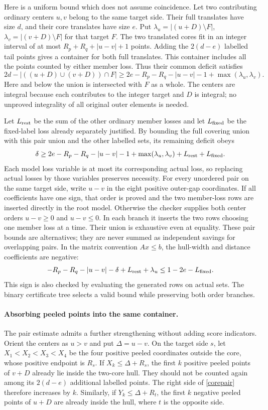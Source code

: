 \documentclass[11pt,a4paper]{article}
\begin{document}
Here is a uniform bound which does not assume coincidence. Let two contributing
ordinary centers $u,v$ belong to the same target side. Their full translates
have size $d$, and their core translates have size $e$. Put
$\lambda_u=|(u+D)\setminus F|$, $\lambda_v=|(v+D)\setminus F|$ for that
target $F$. The two translated cores fit in an integer interval of at most
$R_p+R_q+|u-v|+1$ points. Adding the $2(d-e)$ labelled tail points gives a
container for both full translates. This container includes all the points
counted by either member loss. Thus their common deficit satisfies
\begin{equation}\label{corepair}
 2d-|((u+D)\cup(v+D))\cap F|
 \ge 2e-R_p-R_q-|u-v|-1+\max(\lambda_u,\lambda_v).
\end{equation}
Here and below the union is intersected with $F$ as a whole.
The centers are integral because each contributes to the integer target and
$D$ is integral; no unproved integrality of all original outer elements is needed.

Let $L_{\rm rest}$ be the sum of the other ordinary member losses and let
$L_{\rm fixed}$ be the fixed-label loss already separately justified.
By bounding the full covering union with this pair union and the other
labelled sets, its remaining deficit obeys
\[
 \delta\ge 2e-R_p-R_q-|u-v|-1+
          \max(\lambda_u,\lambda_v)+L_{\rm rest}+L_{\rm fixed}.
\]
Each model loss variable is at most its corresponding actual loss, so replacing
actual losses by those variables preserves necessity. For every unordered
pair on the same target side, write $u-v$ in the eight positive outer-gap
coordinates. If all coefficients have one sign, that order is proved and
the two member-loss rows are inserted directly in the root model. Otherwise
the checker supplies both center orders $u-v\ge0$ and $u-v\le0$. In each branch it inserts the two rows choosing
one member loss at a time. Their union is exhaustive even at equality.
These pair bounds are alternatives; they are never summed as independent
savings for overlapping pairs.
In the matrix convention $Ax\le b$, the hull-width and distance coefficients
are negative:
\[
 -R_p-R_q-|u-v|-\delta+L_{\rm rest}+\lambda_u
 \le 1-2e-L_{\rm fixed}.
\]
This sign is also checked by evaluating the generated rows on actual sets.
 The binary certificate tree selects a valid
bound while preserving both order branches.

\paragraph{Absorbing peeled points into the same container.}
The pair estimate admits a further strengthening without adding score
indicators. Orient the centers as $u>v$ and put $\Delta=u-v$.
On the target side $s$, let $X_1<X_2<X_3<X_4$ be the four positive
peeled coordinates outside the core, whose positive endpoint is $R_s$.
If $X_k\le\Delta+R_s$, the first $k$ positive peeled points of $v+D$
already lie inside the two-core hull. They should not be counted again
among its $2(d-e)$ additional labelled points. The right side of
\eqref{corepair} therefore increases by $k$. Similarly, if $Y_k\le
\Delta+R_t$, the first $k$ negative peeled points of $u+D$ are already
inside the hull, where $t$ is the opposite side.
\end{document}
